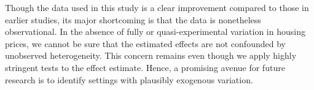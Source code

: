\documentclass[12pt,a4paper]{article}
\begin{document}
Though the data used in this study is a clear improvement compared to those in earlier studies, its major shortcoming is that the data is nonetheless observational. In the absence of fully or quasi-experimental variation in housing prices, we cannot be sure that the estimated effects are not confounded by unobserved heterogeneity. This concern remains even though we apply highly stringent tests to the effect estimate. Hence, a promising avenue for future research is to identify settings with plausibly exogenous variation. 




\end{document}
